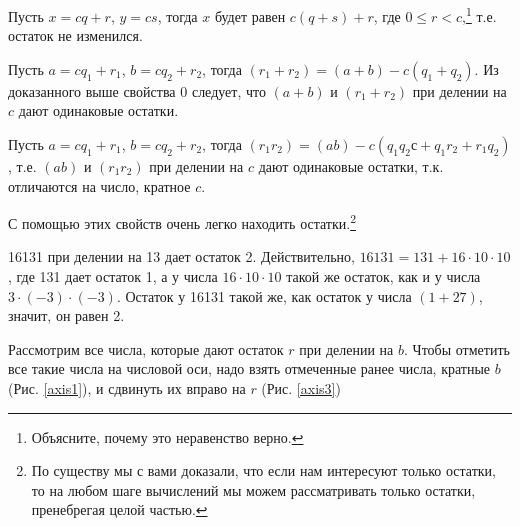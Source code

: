 \begin{dok}
Пусть $x = cq + r$, $y  = cs$, тогда $x$ будет равен $c(q + s) + r$, где $0 \leqslant r < c$,\footnote{Объясните, почему это неравенство верно.} т.е. остаток не изменился.
\end{dok}


\begin{dok}
Пусть $a = cq_1 + r_1$, $b = cq_2 + r_2$, тогда $(r_1 + r_2) = (a + b) - c(q_1 + q_2)$. Из доказанного выше свойства $0$ следует, что $(a + b)$ и $(r_1 + r_2)$ при делении на $c$ дают одинаковые остатки. 
\end{dok}


\begin{dok}
Пусть $a = cq_1 + r_1$, $b = cq_2 + r_2$, тогда $(r_1r_2) = (ab) - c(q_1q_2с + q_1r_2 + r_1q_2)$, т.е. $(ab)$ и $(r_1r_2)$ при делении на $c$ дают одинаковые остатки, т.к. отличаются на число, кратное $c$.
\end{dok}

С помощью этих свойств очень легко находить остатки.\footnote{По существу мы с вами доказали, что если нам интересуют только остатки, то на любом шаге вычислений мы можем рассматривать только остатки, пренебрегая целой частью.}

\begin{samp}
16131 при делении на 13 дает остаток 2. Действительно,   $16131 = 131 + 16\cdot10\cdot10$,    где 131 дает остаток 1,  а у числа $16\cdot10\cdot10$ такой же остаток, как и у числа  $3\cdot(-3)\cdot(-3)$. Остаток у 16131 такой же, как остаток у числа $(1+27)$, значит, он равен 2.
\end{samp}

Рассмотрим все числа, которые дают остаток $r$ при делении на $b$. Чтобы отметить все такие числа на числовой оси, надо взять отмеченные ранее числа, кратные $b$ (Рис. \ref{axis1}), и сдвинуть их вправо на $r$ (Рис. \ref{axis3})

